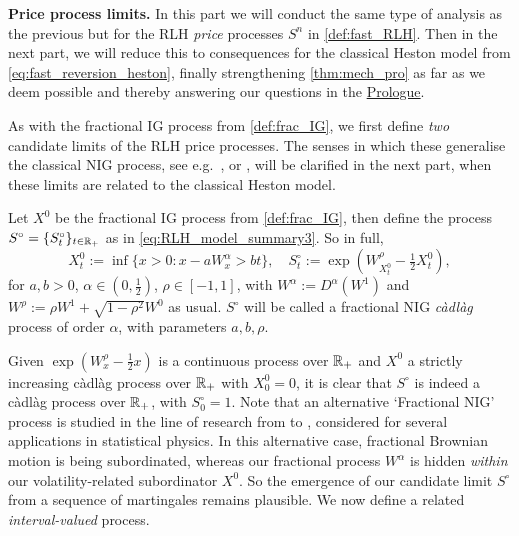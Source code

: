 \vspace{3mm}\textbf{Price process limits.} In this part we will conduct the same type of analysis as the previous but for the RLH \emph{price} processes $S^n$ in \autoref{def:fast_RLH}. Then in the next part, we will reduce this to consequences for the classical Heston model from \autoref{eq:fast_reversion_heston}, finally strengthening \autoref{thm:mech_pro} as far as we deem possible and thereby answering our questions in the \hyperlink{prologue}{Prologue}.

As with the fractional IG process from \autoref{def:frac_IG}, we first define \emph{two} candidate limits of the RLH price processes. The senses in which these generalise the classical NIG process, see e.g.~\cite{barndorff-nielsen_2001a}, \cite{cont_2003} or \cite{applebaum_2009}, will be clarified in the next part, when these limits are related to the classical Heston model.

\begin{definition}\label{def:frac_NIG1}
    Let $X^0$ be the fractional IG process from \autoref{def:frac_IG}, then define the process $S^\circ=\{S^\circ_t\}_{t\in\mathbb{R}_+}$ as in \autoref{eq:RLH_model_summary3}. So in full,
    \begin{equation}
        X^0_t:=\inf\big\{x>0:x-aW^\alpha_x>bt\big\},\quad S^\circ_t:=\exp\left(W^\rho_{X^0_t}-\tfrac12 X^0_t\right),
    \end{equation}
    for $a,b>0$, $\alpha\in(0,\frac12)$, $\rho\in[-1,1]$, with $W^\alpha:=D^\alpha(W^1)$ and $W^\rho:=\rho W^1+\sqrt{1-\rho^2}W^0$ as usual. $S^\circ$ will be called a fractional NIG \emph{c\`adl\`ag} process of order $\alpha$, with parameters $a,b,\rho$.
\end{definition}

Given $\exp(W^\rho_x-\tfrac12 x)$ is a continuous process over $\mathbb{R}_+$ and $X^0$ a strictly increasing c\`adl\`ag process over $\mathbb{R}_+$ with $X^0_0=0$, it is clear that $S^\circ$ is indeed a c\`adl\`ag process over $\mathbb{R}_+$, with $S^\circ_0=1$. Note that an alternative `Fractional NIG' process is studied in the line of research from \cite{kumar_2012} to \cite{wylomanska_2016}, considered for several applications in statistical physics. In this alternative case, fractional Brownian motion is being subordinated, whereas our fractional process $W^\alpha$ is hidden \emph{within} our volatility-related subordinator $X^0$. So the emergence of our candidate limit $S^\circ$ from a sequence of martingales remains plausible. We now define a related \emph{interval-valued} process.

